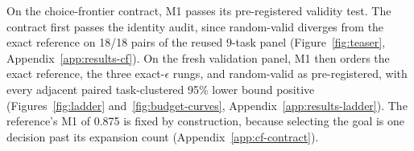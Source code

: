 On the choice-frontier contract, M1 passes its pre-registered validity test. The contract first passes the identity audit, since random-valid diverges from the exact reference on 18/18 pairs of the reused 9-task panel (Figure~\ref{fig:teaser}, Appendix~\ref{app:results-cf}). On the fresh validation panel, M1 then orders the exact reference, the three exact-$\epsilon$ rungs, and random-valid as pre-registered, with every adjacent paired task-clustered 95\% lower bound positive (Figures~\ref{fig:ladder} and~\ref{fig:budget-curves}, Appendix~\ref{app:results-ladder}). The reference's M1 of 0.875 is fixed by construction, because selecting the goal is one decision past its expansion count (Appendix~\ref{app:cf-contract}).


